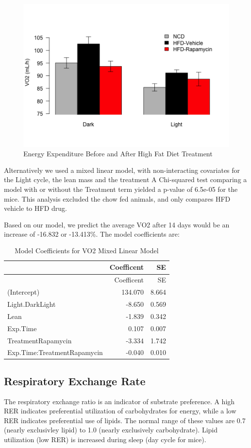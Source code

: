 \documentclass[]{article}
\begin{document}
\begin{figure}[htbp]
\centering
\includegraphics{figures/vo2-barplot-1.png}
\caption{Energy Expenditure Before and After High Fat Diet Treatment}
\end{figure}

Alternatively we used a mixed linear model, with non-interacting
covariates for the Light cycle, the lean mass and the treatment A
Chi-squared test comparing a model with or without the Treatment term
yielded a p-value of 6.5e-05 for the mice. This analysis excluded the
chow fed animals, and only compares HFD vehicle to HFD drug.

Based on our model, we predict the average VO2 after 14 days would be an
increase of -16.832 or -13.413\%. The model coefficients are:

\begin{longtable}[c]{@{}lrr@{}}
\caption{Model Coefficients for VO2 Mixed Linear Model}\tabularnewline
\toprule
& Coefficent & SE\tabularnewline
\midrule
\endfirsthead
\toprule
& Coefficent & SE\tabularnewline
\midrule
\endhead
(Intercept) & 134.070 & 8.664\tabularnewline
Light.DarkLight & -8.650 & 0.569\tabularnewline
Lean & -1.839 & 0.342\tabularnewline
Exp.Time & 0.107 & 0.007\tabularnewline
TreatmentRapamycin & -3.334 & 1.742\tabularnewline
Exp.Time:TreatmentRapamycin & -0.040 & 0.010\tabularnewline
\bottomrule
\end{longtable}

\subsection{Respiratory Exchange Rate}\label{respiratory-exchange-rate}

The respiratory exchange ratio is an indicator of substrate preference.
A high RER indicates preferential utilization of carbohydrates for
energy, while a low RER indicates preferential use of lipids. The normal
range of these values are 0.7 (nearly exclusivley lipid) to 1.0 (nearly
exclusively carbohydrate). Lipid utilization (low RER) is increased
during sleep (day cycle for mice).
\end{document}
